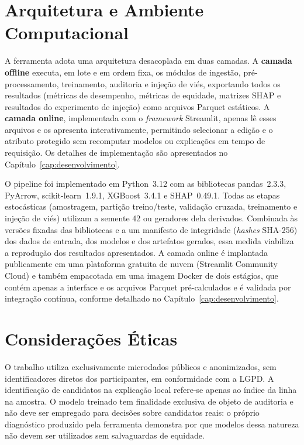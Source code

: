 \section{Arquitetura e Ambiente Computacional}
\label{sec:arquitetura}

A ferramenta adota uma arquitetura desacoplada em duas camadas. A \textbf{camada offline} executa, em lote e em ordem fixa, os módulos de ingestão, pré-processamento, treinamento, auditoria e injeção de viés, exportando todos os resultados (métricas de desempenho, métricas de equidade, matrizes SHAP e resultados do experimento de injeção) como arquivos Parquet estáticos. A \textbf{camada online}, implementada com o \textit{framework} Streamlit, apenas lê esses arquivos e os apresenta interativamente, permitindo selecionar a edição e o atributo protegido sem recomputar modelos ou explicações em tempo de requisição. Os detalhes de implementação são apresentados no Capítulo~\ref{cap:desenvolvimento}.

O pipeline foi implementado em Python~3.12 com as bibliotecas pandas~2.3.3, PyArrow, scikit-learn~1.9.1, XGBoost~3.4.1 e SHAP~0.49.1. Todas as etapas estocásticas (amostragem, partição treino/teste, validação cruzada, treinamento e injeção de viés) utilizam a semente 42 ou geradores dela derivados. Combinada às versões fixadas das bibliotecas e a um manifesto de integridade (\textit{hashes} SHA-256) dos dados de entrada, dos modelos e dos artefatos gerados, essa medida viabiliza a reprodução dos resultados apresentados. A camada online é implantada publicamente em uma plataforma gratuita de nuvem (Streamlit Community Cloud) e também empacotada em uma imagem Docker de dois estágios, que contém apenas a interface e os arquivos Parquet pré-calculados e é validada por integração contínua, conforme detalhado no Capítulo~\ref{cap:desenvolvimento}.

\section{Considerações Éticas}
\label{sec:etica}

O trabalho utiliza exclusivamente microdados públicos e anonimizados, sem identificadores diretos dos participantes, em conformidade com a LGPD. A identificação de candidatos na explicação local refere-se apenas ao índice da linha na amostra. O modelo treinado tem finalidade exclusiva de objeto de auditoria e não deve ser empregado para decisões sobre candidatos reais: o próprio diagnóstico produzido pela ferramenta demonstra por que modelos dessa natureza não devem ser utilizados sem salvaguardas de equidade.

